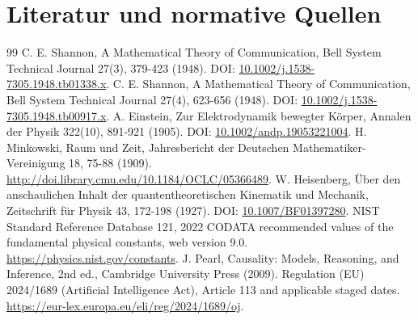 \documentclass[11pt,a4paper]{article}
\begin{document}
\section{Literatur und normative Quellen}
\begin{thebibliography}{99}
 C. E. Shannon, A Mathematical Theory of Communication, Bell System Technical Journal 27(3), 379-423 (1948). DOI: \href{https://doi.org/10.1002/j.1538-7305.1948.tb01338.x}{10.1002/j.1538-7305.1948.tb01338.x}.
 C. E. Shannon, A Mathematical Theory of Communication, Bell System Technical Journal 27(4), 623-656 (1948). DOI: \href{https://doi.org/10.1002/j.1538-7305.1948.tb00917.x}{10.1002/j.1538-7305.1948.tb00917.x}.
 A. Einstein, Zur Elektrodynamik bewegter Körper, Annalen der Physik 322(10), 891-921 (1905). DOI: \href{https://doi.org/10.1002/andp.19053221004}{10.1002/andp.19053221004}.
 H. Minkowski, Raum und Zeit, Jahresbericht der Deutschen Mathematiker-Vereinigung 18, 75-88 (1909). \url{http://doi.library.cmu.edu/10.1184/OCLC/05366489}.
 W. Heisenberg, Über den anschaulichen Inhalt der quantentheoretischen Kinematik und Mechanik, Zeitschrift für Physik 43, 172-198 (1927). DOI: \href{https://doi.org/10.1007/BF01397280}{10.1007/BF01397280}.
 NIST Standard Reference Database 121, 2022 CODATA recommended values of the fundamental physical constants, web version 9.0. \url{https://physics.nist.gov/constants}.
 J. Pearl, Causality: Models, Reasoning, and Inference, 2nd ed., Cambridge University Press (2009).
 Regulation (EU) 2024/1689 (Artificial Intelligence Act), Article 113 and applicable staged dates. \url{https://eur-lex.europa.eu/eli/reg/2024/1689/oj}.
\end{thebibliography}
\end{document}
